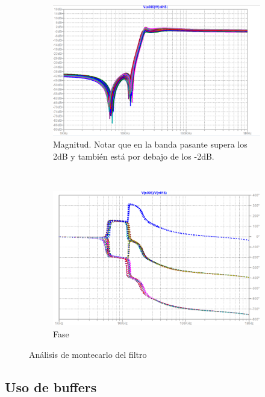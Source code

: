 \documentclass[../../tc_tp5_main.tex]{subfiles}
\begin{document}
\begin{figure}[H]	%
	\centering
	\begin{subfigure}[t]{0.7\textwidth}
		\centering
		\includegraphics[width=\textwidth]{imagenes/montecarlo_total.png}
		\caption{Magnitud. Notar que en la banda pasante supera los 2dB y tambi\'en est\'a por debajo de los -2dB.}
		\label{fig:ej3_mc_filtro_mag}
	\end{subfigure}\\
	\begin{subfigure}[t]{0.7\textwidth}
		\centering
		\includegraphics[width=\textwidth]{imagenes/montecarlo_total_fase.png}
		\caption{Fase}
		\label{fig:ej3_mc_filtro_fase}
	\end{subfigure}	
	\caption{An\'alisis de montecarlo del filtro}
\end{figure}


\subsection{Uso de buffers}
\end{document}
